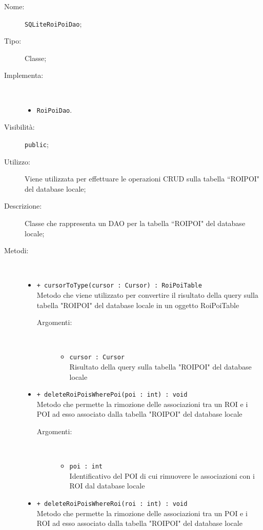 \documentclass[../DefinizioneDiProdotto.tex]{subfiles}
\begin{document}
    \begin{description}
\item[Nome:] \texttt{SQLiteRoiPoiDao};
\item[Tipo:] Classe;
\item[Implementa:] \
\begin{itemize}
\item \texttt{RoiPoiDao}.

\end{itemize}
\item[Visibilità:] \texttt{public};
\item[Utilizzo:] Viene utilizzata per effettuare le operazioni CRUD sulla tabella “ROIPOI" del database locale;
\item[Descrizione:] Classe che rappresenta un DAO per la tabella “ROIPOI" del database locale;
\item[Metodi:] \
\begin{itemize}
\item \texttt{+ cursorToType(cursor : Cursor) : RoiPoiTable}\\
Metodo che viene utilizzato per convertire il risultato della query sulla tabella "ROIPOI" del database locale in un oggetto RoiPoiTable
 \begin{description}
\item[Argomenti:] \
\begin{itemize}
\item \texttt{cursor : Cursor}\\
Risultato della query sulla tabella "ROIPOI" del database locale\end{itemize}
\end{description}
\item \texttt{+ deleteRoiPoisWherePoi(poi : int) : void}\\
Metodo che permette la rimozione delle associazioni tra un ROI e i POI ad esso associato dalla tabella "ROIPOI" del database locale 
 \begin{description}
\item[Argomenti:] \
\begin{itemize}
\item \texttt{poi : int}\\
Identificativo del POI di cui rimuovere le associazioni con i ROI dal database locale\end{itemize}
\end{description}
\item \texttt{+ deleteRoiPoisWhereRoi(roi : int) : void}\\
Metodo che permette la rimozione delle associazioni tra un POI e i ROI ad esso associato dalla tabella "ROIPOI" del database locale 

\end{itemize}
\end{description}
\end{document}
